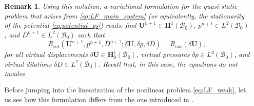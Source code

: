 \documentclass{sfuthesis}
\numberwithin{equation}{section}
\numberwithin{figure}{chapter}
\numberwithin{table}{chapter}
\newtheorem{remark}[theorem]{Remark}
\theoremstyle{definition}
\def\*#1{{\mathbf{#1}}} %
\newcommand{\B}{\mathcal{B}}
\begin{document}
\begin{remark}
    Using this notation, a variational formulation for the quasi-static problem that arises from \eqref{eq:LF_main_system} (or equivalently, the stationarity of the potential \eqref{eq:potential_qs}) reads: find $\*U^{n+1} \in \*H^1(\B_0)$, $p^{n+1} \in L^2(\B_0)$, and $D^{n+1} \in L^2(\B_0)$ such that
    \begin{equation}
        R_{int}(\*U^{n+1}, p^{n+1}, D^{n+1} ; \delta\*U, \delta p, \delta D) = R_{ext}(\delta \*U),
    \end{equation} 
    for all virtual displacements $\delta\*U \in \*H_0^1(\B_0)$, virtual pressures $\delta p \in L^2(\B_0)$, and virtual dilations $\delta D \in L^2(\B_0)$. Recall that, in this case, the equations do not involve
\end{remark}

Before jumping into the linearization of the nonlinear problem \eqref{eq:LF_weak}, let us see how this formulation differs from the one introduced in \cite{Seba}.
\end{document}
